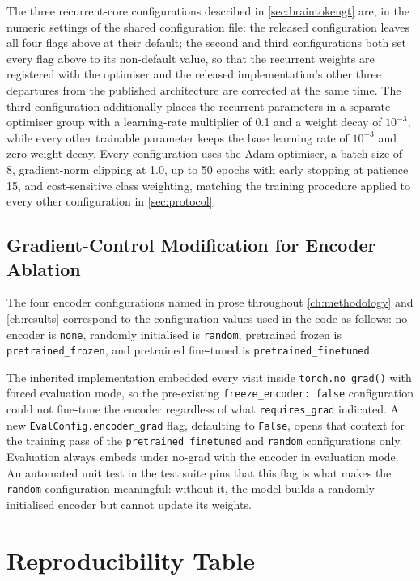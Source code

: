 The three recurrent-core configurations described in \autoref{sec:braintokengt} are, in the
numeric settings of the shared configuration file: the released configuration leaves all
four flags above at their default; the second and third configurations both set every flag
above to its non-default value, so that the recurrent weights are registered with the
optimiser and the released implementation's other three departures from the published
architecture are corrected at the same time. The third configuration additionally places
the recurrent parameters in a separate optimiser group with a learning-rate multiplier of
0.1 and a weight decay of $10^{-3}$, while every other trainable parameter keeps the base
learning rate of $10^{-3}$ and zero weight decay. Every configuration uses the Adam
optimiser, a batch size of 8, gradient-norm clipping at 1.0, up to 50 epochs with early
stopping at patience 15, and cost-sensitive class weighting, matching the training
procedure applied to every other configuration in \autoref{sec:protocol}.

\section*{Gradient-Control Modification for Encoder Ablation}

The four encoder configurations named in prose throughout \autoref{ch:methodology} and
\autoref{ch:results} correspond to the configuration values used in the code as follows:
no encoder is \texttt{none}, randomly initialised is \texttt{random}, pretrained frozen is
\texttt{pretrained\_frozen}, and pretrained fine-tuned is \texttt{pretrained\_finetuned}.

The inherited implementation embedded every visit inside \texttt{torch.no\_grad()} with
forced evaluation mode, so the pre-existing \texttt{freeze\_encoder: false} configuration
could not fine-tune the encoder regardless of what \texttt{requires\_grad} indicated. A
new \texttt{EvalConfig.encoder\_grad} flag, defaulting to \texttt{False}, opens that
context for the training pass of the \texttt{pretrained\_finetuned} and \texttt{random}
configurations only. Evaluation always embeds under no-grad with the encoder in evaluation mode. An automated unit test in the test suite pins that this flag is what makes the \texttt{random} configuration meaningful: without it, the model
builds a randomly initialised encoder but cannot update its weights.


\chapter{Reproducibility Table}\label{ch:app-reproducibility}

